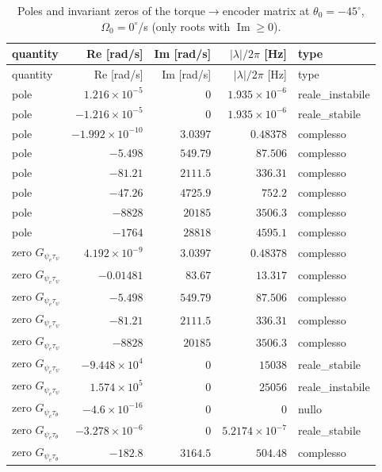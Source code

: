 \documentclass[10pt,a4paper]{article}
\numberwithin{equation}{section}
\begin{document}
\begin{longtable}{lrrrl}
\caption{Poles and invariant zeros of the torque$\to$encoder matrix at $\theta_0 = -45^\circ$, $\Omega_0 = 0^\circ$/s (only roots with $\operatorname{Im} \ge 0$).}\label{tab:polezero}\\
\toprule quantity & Re [rad/s] & Im [rad/s] & $|\lambda|/2\pi$ [Hz] & type \\ \midrule\endfirsthead
\toprule quantity & Re [rad/s] & Im [rad/s] & $|\lambda|/2\pi$ [Hz] & type \\ \midrule\endhead
pole & $1.216\times10^{-5}$ & $0$ & $1.935\times10^{-6}$ & reale\_instabile \\
pole & $-1.216\times10^{-5}$ & $0$ & $1.935\times10^{-6}$ & reale\_stabile \\
pole & $-1.992\times10^{-10}$ & $3.0397$ & $0.48378$ & complesso \\
pole & $-5.498$ & $549.79$ & $87.506$ & complesso \\
pole & $-81.21$ & $2111.5$ & $336.31$ & complesso \\
pole & $-47.26$ & $4725.9$ & $752.2$ & complesso \\
pole & $-8828$ & $20185$ & $3506.3$ & complesso \\
pole & $-1764$ & $28818$ & $4595.1$ & complesso \\
\midrule
zero $G_{\psi_e\tau_\psi}$ & $4.192\times10^{-9}$ & $3.0397$ & $0.48378$ & complesso \\
zero $G_{\psi_e\tau_\psi}$ & $-0.01481$ & $83.67$ & $13.317$ & complesso \\
zero $G_{\psi_e\tau_\psi}$ & $-5.498$ & $549.79$ & $87.506$ & complesso \\
zero $G_{\psi_e\tau_\psi}$ & $-81.21$ & $2111.5$ & $336.31$ & complesso \\
zero $G_{\psi_e\tau_\psi}$ & $-8828$ & $20185$ & $3506.3$ & complesso \\
zero $G_{\psi_e\tau_\psi}$ & $-9.448\times10^{4}$ & $0$ & $15038$ & reale\_stabile \\
zero $G_{\psi_e\tau_\psi}$ & $1.574\times10^{5}$ & $0$ & $25056$ & reale\_instabile \\
\midrule
zero $G_{\psi_e\tau_\theta}$ & $-4.6\times10^{-16}$ & $0$ & $0$ & nullo \\
zero $G_{\psi_e\tau_\theta}$ & $-3.278\times10^{-6}$ & $0$ & $5.2174\times10^{-7}$ & reale\_stabile \\
zero $G_{\psi_e\tau_\theta}$ & $-182.8$ & $3164.5$ & $504.48$ & complesso \\

\end{longtable}
\end{document}
